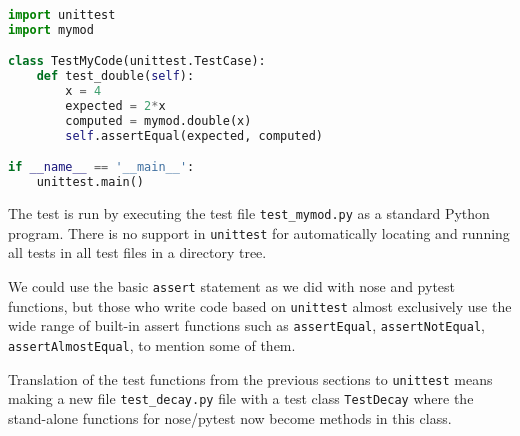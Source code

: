 \documentclass[graybox,sectrefs,envcountresetchap,open=right,final]{svmonodo}
\begin{document}
\begin{lstlisting}[language=python,style=blue1_bluegreen]
import unittest
import mymod

class TestMyCode(unittest.TestCase):
    def test_double(self):
        x = 4
        expected = 2*x
        computed = mymod.double(x)
        self.assertEqual(expected, computed)

if __name__ == '__main__':
    unittest.main()

\end{lstlisting}

The test is run by executing the test file \Verb!test_mymod.py! as a standard
Python program. There is no support in \texttt{unittest} for automatically
locating and running all tests in all test files in a directory tree.

We could use the basic \texttt{assert} statement as we did with nose and pytest
functions, but those who write code based on \texttt{unittest} almost
exclusively use the wide range of built-in assert functions such
as \texttt{assertEqual}, \texttt{assertNotEqual}, \texttt{assertAlmostEqual}, to mention
some of them.

Translation of the test functions from the previous sections
to \texttt{unittest} means making a new file \Verb!test_decay.py! file with a
test class \texttt{TestDecay} where the stand-alone functions for
nose/pytest now become methods in this class.
\end{document}

